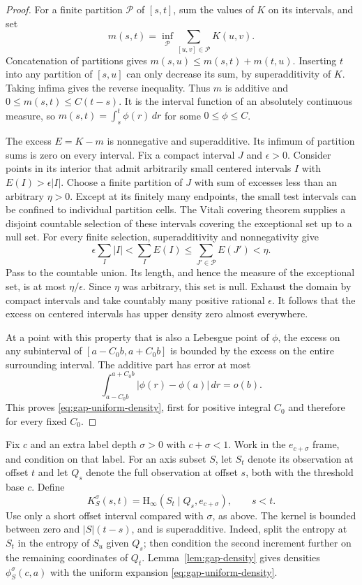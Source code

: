 \begin{proof}
For a finite partition $\mathcal P$ of $[s,t]$, sum the values of $K$
on its intervals, and set
\[
 m(s,t)=\inf_{\mathcal P}\sum_{[u,v]\in\mathcal P}K(u,v).
\]
Concatenation of partitions gives
$m(s,u)\le m(s,t)+m(t,u)$.  Inserting $t$ into any partition of
$[s,u]$ can only decrease its sum, by superadditivity of $K$.
Taking infima gives the reverse inequality.  Thus $m$ is additive and
$0\le m(s,t)\le C(t-s)$.  It is the interval function of an
absolutely continuous measure, so
$m(s,t)=\int_s^t\phi(r)\,dr$ for some $0\le\phi\le C$.

The excess $E=K-m$ is nonnegative and superadditive.  Its infimum of
partition sums is zero on every interval.  Fix a compact interval $J$
and $\epsilon>0$.  Consider points in its interior that admit arbitrarily
small centered intervals $I$ with $E(I)>\epsilon|I|$.
Choose a finite partition of $J$ with sum of excesses less than an
arbitrary $\eta>0$.  Except at its finitely many endpoints, the small
test intervals can be confined to individual partition cells.  The
Vitali covering theorem supplies a disjoint countable selection of
these intervals covering the exceptional set up to a null set.
For every finite selection, superadditivity and nonnegativity give
\[
 \epsilon\sum_I|I|<\sum_I E(I)
             \le\sum_{J'\in\mathcal P}E(J')<\eta.
\]
Pass to the countable union.  Its length, and hence the measure of the
exceptional set, is at most $\eta/\epsilon$.  Since $\eta$ was
arbitrary, this set is null.  Exhaust the domain by compact intervals
and take countably many positive rational $\epsilon$.  It follows that
the excess on centered intervals has upper density zero almost
everywhere.

At a point with this property that is also a Lebesgue point of $\phi$,
the excess on any subinterval of $[a-C_0b,a+C_0b]$ is bounded by the
excess on the entire surrounding interval.  The additive part has error
at most
\[
 \int_{a-C_0b}^{a+C_0b}|\phi(r)-\phi(a)|\,dr=o(b).
\]
This proves \eqref{eq:gap-uniform-density}, first for positive integral
$C_0$ and therefore for every fixed $C_0$.
\end{proof}

Fix $c$ and an extra label depth $\sigma>0$ with $c+\sigma<1$.
Work in the $e_{c+\sigma}$ frame, and condition on that label.
For an axis subset $S$, let $S_t$ denote its observation at offset $t$
and let $Q_s$ denote the full observation at offset $s$, both with the
threshold base $c$.  Define
\begin{equation}
 K_S^\sigma(s,t)=\mathrm H_\infty
          (S_t\mid Q_s,e_{c+\sigma}),\qquad s<t.
 \label{eq:entropy-gap-kernel}
\end{equation}
Use only a short offset interval compared with $\sigma$, as above.
The kernel is bounded between zero and $|S|(t-s)$, and is
superadditive.  Indeed, split the entropy at $S_t$ in the entropy
of $S_u$ given $Q_s$; then condition the second increment further
on the remaining coordinates of $Q_t$.  Lemma~\ref{lem:gap-density}
gives densities $\phi_S^\sigma(c,a)$ with the uniform expansion
\eqref{eq:gap-uniform-density}.

